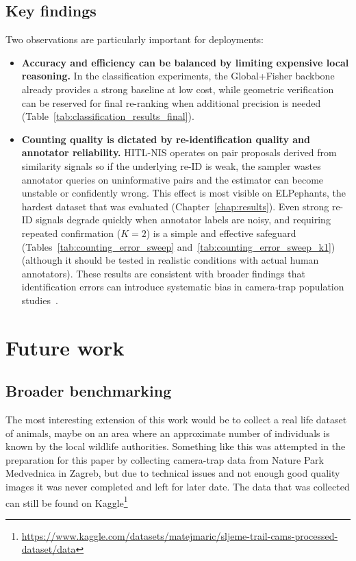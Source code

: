 \subsection{Key findings}
Two observations are particularly important for deployments:
\begin{itemize}
    \item \textbf{Accuracy and efficiency can be balanced by limiting expensive local reasoning.} In the classification experiments, the Global+Fisher backbone already provides a strong baseline at low cost, while geometric verification can be reserved for final re-ranking when additional precision is needed (Table~\ref{tab:classification_results_final}).
    \item \textbf{Counting quality is dictated by re-identification quality and annotator reliability.} HITL-NIS operates on pair proposals derived from similarity signals so if the underlying re-ID is weak, the sampler wastes annotator queries on uninformative pairs and the estimator can become unstable or confidently wrong. This effect is most visible on ELPephants, the hardest dataset that was evaluated (Chapter~\ref{chap:results}). Even strong re-ID signals degrade quickly when annotator labels are noisy, and requiring repeated confirmation (\(K=2\)) is a simple and effective safeguard (Tables~\ref{tab:counting_error_sweep} and~\ref{tab:counting_error_sweep_k1}) (although it should be tested in realistic conditions with actual human annotators). These results are consistent with broader findings that identification errors can introduce systematic bias in camera-trap population studies~\cite{Johansson_Samelius_Wikberg_Chapron_Mishra_Low_2020}.
\end{itemize}

\section{Future work}
\subsection{Broader benchmarking}

The most interesting extension of this work would be to collect a real life dataset of animals, maybe on an area where an approximate number of individuals is known by the local wildlife authorities. Something like this was attempted in the preparation for this paper by collecting camera-trap data from Nature Park Medvednica in Zagreb, but due to technical issues and not enough good quality images it was never completed and left for later date. The data that was collected can still be found on Kaggle\footnote{\url{https://www.kaggle.com/datasets/matejmaric/sljeme-trail-cams-processed-dataset/data}}

